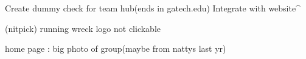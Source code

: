 Create dummy check for team hub(ends in gatech.edu)
Integrate with website^

(nitpick) running wreck logo not clickable

home page :
    big photo of group(maybe from nattys last yr)




